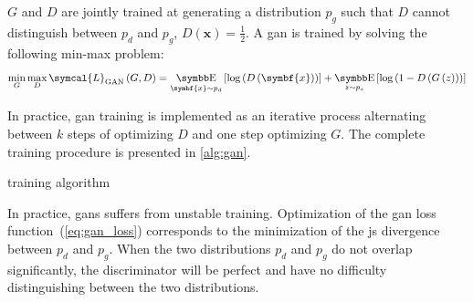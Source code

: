 \documentclass[../main.tex]{subfiles}
\begin{document}
		\(G\) and \(D\) are jointly trained at generating a distribution \(p_{g}\) such that \(D\) cannot distinguish between \(p_{d}\) and \(p_{g}\), \ie{}\(D\left(\symbf{x}\right) = \tfrac12\).
		A \gls{gan} is trained by solving the following min-max problem:
		\begin{equation}
			\min_{G} \max_{D} \symcal{L}_{\text{GAN}}\left(G,D\right) = \E_{\symbf{x}\sim p_{d}}\left[ \log\left(D\left(\symbf{x}\right)\right)\right] + \E_{z\sim p_{z}}\left[ \log\left( 1 - D\left(G\left(z\right)\right)\right)\right] \label{eq:gan_loss}
		\end{equation}

		In practice, \gls{gan} training is implemented as an iterative process alternating between \(k\) steps of optimizing \(D\) and one step optimizing \(G\).
		The complete training procedure is presented in \cref{alg:gan}.
		\begin{algorithm}[htbp]
			\DontPrintSemicolon
			\caption{ training algorithm}\label{alg:gan}
		\end{algorithm}
		In practice, \glspl{gan} suffers from unstable training.
		Optimization of the \gls{gan} loss function~(\cref{eq:gan_loss}) corresponds to the minimization of the \gls{js} divergence between \(p_{d}\) and \(p_{g}\).
		When the two distributions \(p_d\) and \(p_g\) do not overlap significantly, the discriminator will be perfect and have no difficulty distinguishing between the two distributions.
\end{document}
